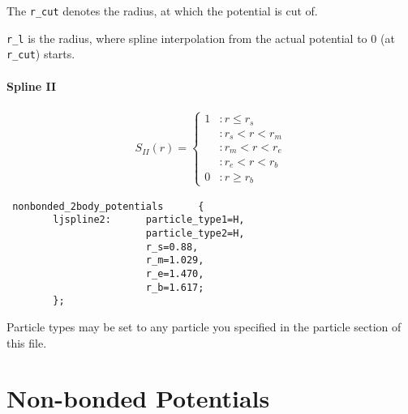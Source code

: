 The {\tt r\_cut} denotes the radius, at which the potential is cut of.

{\tt r\_l} is the radius, where spline interpolation from the actual potential to 0 (at {\tt r\_cut}) starts.


\paragraph{Spline II} 
\begin{align*}
S_{II}(r) = \left\{ \begin{array}{ll} 1 &:r \leq r_s \\ &:r_s < r < r_{m} \\  &:r_m < r < r_{e} \\  &:r_e < r < r_{b} \\ 0&:r\geq r_{b} \end{array} \right.
\end{align*}

\begin{lstlisting}
 nonbonded_2body_potentials      {
        ljspline2:      particle_type1=H,
                        particle_type2=H,
                        r_s=0.88,
                        r_m=1.029,
                        r_e=1.470,
                        r_b=1.617;
        };
\end{lstlisting}
Particle types may be set to any particle you specified in the particle section of this file.


\section{Non-bonded Potentials}

